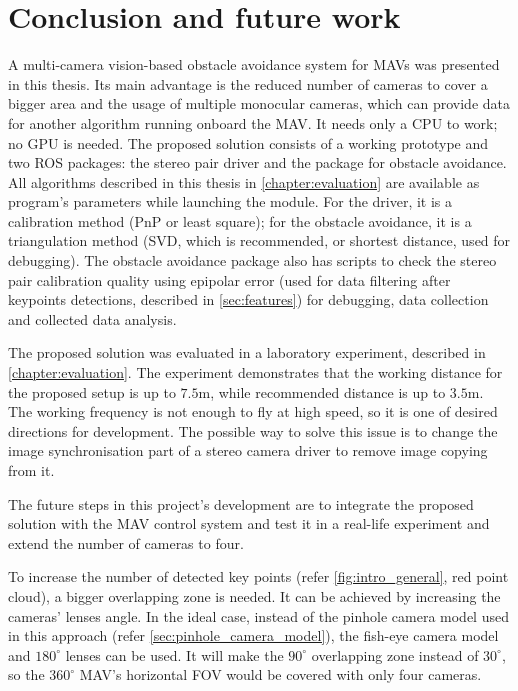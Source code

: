 \chapter{Conclusion and future work}
\label{chapter:conclusion}

A multi-camera vision-based obstacle avoidance system for MAVs was presented in this thesis. 
Its main advantage is the reduced number of cameras to cover a bigger area and the usage of multiple monocular cameras, which can provide data for another algorithm running onboard the MAV.
It needs only a CPU to work; no GPU is needed.
The proposed solution consists of a working prototype and two ROS packages: the stereo pair driver and the package for obstacle avoidance.
All algorithms described in this thesis in \autoref{chapter:evaluation} are available as program's parameters while launching the module.
For the driver, it is a calibration method (PnP or least square); for the obstacle avoidance, it is a triangulation method (SVD, which is recommended, or shortest distance, used for debugging).
The obstacle avoidance package also has scripts to check the stereo pair calibration quality using epipolar error (used for data filtering after keypoints detections, described in \autoref{sec:features}) for debugging, data collection and collected data analysis.

The proposed solution was evaluated in a laboratory experiment, described in \autoref{chapter:evaluation}. 
The experiment demonstrates that the working distance for the proposed setup is up to $7.5$m, while recommended distance is up to $3.5$m. 
The working frequency is not enough to fly at high speed, so it is one of desired directions for development.
The possible way to solve this issue is to change the image synchronisation part of a stereo camera driver to remove image copying from it.

The future steps in this project's development are to integrate the proposed solution with the MAV control system and test it in a real-life experiment and extend the number of cameras to four.

To increase the number of detected key points (refer \autoref{fig:intro_general}, red point cloud), a bigger overlapping zone is needed.
It can be achieved by increasing the cameras' lenses angle.
In the ideal case, instead of the pinhole camera model used in this approach (refer \autoref{sec:pinhole_camera_model}), the fish-eye camera model and $180^\circ$ lenses can be used.
It will make the $90^\circ$ overlapping zone instead of $30^\circ$, so the $360^\circ$ MAV's horizontal FOV would be covered with only four cameras.

